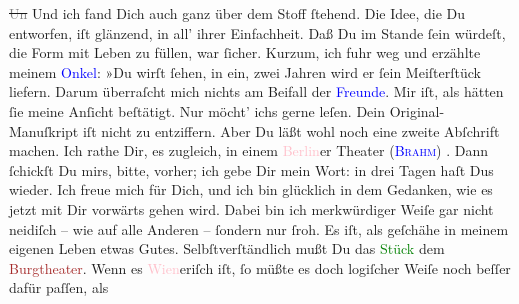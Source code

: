 \documentclass[twoside=false,titlepage=false,open=any, parskip=never, fontsize=12pt, headings=small, chapterprefix=false, appendixprefix=false]{scrbook}
\newcommand{\strikeout}[1]{\sout{#1}}
\newcommand{\pbposition}{\depth}
\newcommand{\pb}{\nobreak\hspace{0pt}\raisebox{-0.1em}{\raisebox{\pbposition}{\textnormal{|}}}\nobreak\hspace{0pt}}
\begin{document}
                  \strikeout{\textcolor{gray}{Un}} Und ich fand Dich auch ganz
               über dem Stoff ſtehend. Die Idee, die Du entworfen, iſt glänzend, in all’ ihrer
               Einfachheit. Daß Du im Stande ſein würdeſt, die Form mit Leben zu füllen, war ſicher.
               Kurzum, ich fuhr weg und erzählte meinem \textcolor{blue}{Onkel}{}: »Du wirſt ſehen, in ein, zwei Jahren wird er ſein
               Meiſterſtück liefern. Darum überraſcht mich nichts am Beifall der \textcolor{blue}{Freunde}{}. Mir iſt, als hätten ſie meine
               Anſicht beſtätigt. Nur möcht’ ichs gerne leſen. Dein Original-{\pb}Manuſkript iſt nicht zu entziffern. Aber Du läßt
               wohl noch eine zweite Abſchrift machen. Ich rathe Dir, es zugleich, in einem \textcolor{pink}{Berlin}{}\ledrightnote{\textcolor{pink}{Berlin}}er Theater (\textsc{\textcolor{blue}{Brahm}{}\ledrightnote{\textcolor{blue}{Otto Brahm}}}) \label{K_L02616-3v}\label{K_L02616-3h}. Dann ſchickſt Du mirs, bitte, vorher; ich gebe Dir mein Wort: in
               drei Tagen haſt Dus wieder. Ich freue mich für Dich, und ich bin glücklich in dem
               Gedanken, wie es jetzt mit Dir vorwärts gehen wird. Dabei bin ich merkwürdiger Weiſe
               gar nicht neidiſch – wie auf alle Anderen – ſondern nur ſroh. Es iſt, als geſchähe in
               meinem eigenen Leben etwas Gutes.\pend
           \pstart
           {\pb}Selbſtverſtändlich mußt Du das \textcolor{green}{Stück}{} dem \textcolor{brown}{Burgtheater}{}\ledrightnote{\textcolor{brown}{Burgtheater}}\label{K_L02616-6v}\label{K_L02616-6h}. Wenn es \textcolor{pink}{Wien}{}\ledrightnote{\textcolor{pink}{Wien}}eriſch iſt, ſo müßte es doch logiſcher Weiſe noch beſſer dafür paſſen, als
\end{document}
